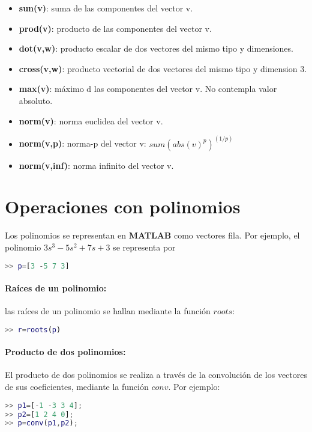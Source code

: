 \begin{itemize}
\item \textbf{sun(v)}: suma de las componentes del vector v.
\item \textbf{prod(v)}: producto de las componentes del vector v.
\item \textbf{dot(v,w)}: producto escalar de dos vectores del mismo tipo y dimensiones.
\item \textbf{cross(v,w)}: producto vectorial de dos vectores del mismo tipo y dimension 3.
\item \textbf{max(v)}: máximo d las componentes del vector v. No contempla valor absoluto.
\item \textbf{norm(v)}: norma euclidea del vector v.
\item \textbf{norm(v,p)}: norma-p del vector v: $sum(abs(v)^p)^(1/p)$
\item \textbf{norm(v,inf)}: norma infinito del vector v.
\end{itemize}

\section{Operaciones con polinomios}

Los polinomios se representan en \textbf{MATLAB} como vectores fila. Por ejemplo, el polinomio
$3s^3  -5s^2 + 7s + 3$ se representa por

\begin{lstlisting}[language=Matlab]
>> p=[3 -5 7 3]
\end{lstlisting}

\paragraph{Raíces de un polinomio:}las raíces de un polinomio se hallan mediante la función $roots$:
\begin{lstlisting}[language=Matlab]
>> r=roots(p)
\end{lstlisting}

\paragraph{Producto de dos polinomios:}
El producto de dos polinomios se realiza a través de la convolución de los vectores de sus coeficientes, mediante la función $conv$. Por ejemplo:
\begin{lstlisting}[language=Matlab]
>> p1=[-1 -3 3 4];
>> p2=[1 2 4 0];
>> p=conv(p1,p2);
\end{lstlisting}

